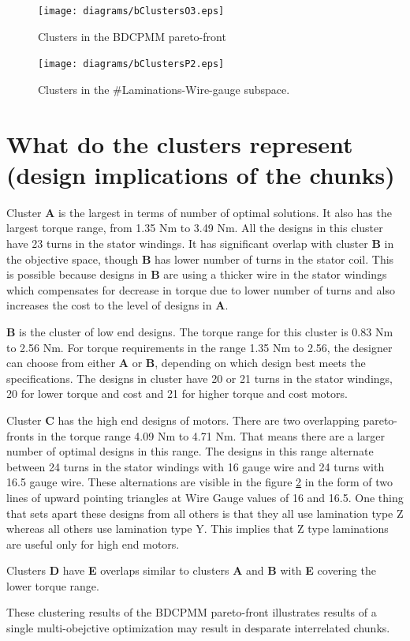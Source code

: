 \begin{figure}[ht]\begin{center}
 \texttt{[image: diagrams/bClustersO3.eps]} 
 \caption{Clusters in the BDCPMM pareto-front}
 \label{bClustersO}
\end{center}\end{figure}

\begin{figure}[ht]\begin{center}
 \texttt{[image: diagrams/bClustersP2.eps]} 
 \caption{Clusters in the \#Laminations-Wire-gauge subspace.}
 \label{bClustersP}
\end{center}\end{figure}
 

\section{What do the clusters represent (design implications of the chunks)}
Cluster \textbf{A} is the largest in terms of number of optimal 
solutions. It also has the largest torque range, from 1.35 Nm to 3.49
Nm. All the designs in this cluster have 23 turns in the stator 
windings. It  has significant overlap with cluster \textbf{B} in the 
objective space, though \textbf{B} has lower number of turns in the 
stator coil. This is possible because designs in \textbf{B} are using
a thicker wire in the stator windings which compensates for decrease 
in torque due to lower number of turns and also increases the cost to 
the level of designs in \textbf{A}.

\textbf{B} is the cluster of low end designs. The torque range for 
this cluster is 0.83 Nm to 2.56 Nm. For torque requirements in the 
range 1.35 Nm to 2.56, the designer can choose from either \textbf{A}
or \textbf{B}, depending on which design best meets the 
specifications. The designs in cluster have 20 or 21 turns in the 
stator windings, 20 for lower torque and cost and 21 for higher torque
and cost motors. 

 
Cluster \textbf{C} has the high end designs of motors. There are two 
overlapping pareto-fronts in the torque range 4.09 Nm to 4.71 Nm. That
means there are a larger number of optimal designs in this range. The
designs in this range alternate between 24 turns in the stator 
windings with 16 gauge wire and 24 turns with 16.5 gauge wire. These 
alternations are visible in the figure \ref{bClustersP} in the form of
two lines of upward pointing triangles at Wire Gauge values of 16 and
16.5. One thing that sets apart these designs from all others is that 
they all use lamination type Z whereas all others use lamination type 
Y. This implies that Z type laminations are useful only for high end
motors.

Clusters \textbf{D} have \textbf{E} overlaps similar to clusters 
\textbf{A} and \textbf{B} with \textbf{E} covering the lower torque 
range. 


These clustering results of the BDCPMM pareto-front illustrates 
results of a single multi-obejctive optimization may result in 
desparate interrelated chunks.
